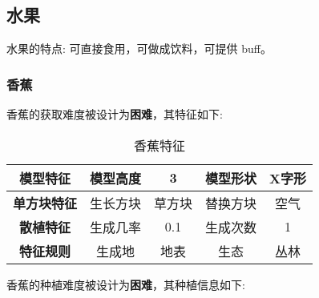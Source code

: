 \subsection{水果}

水果的特点: 可直接食用，可做成饮料，可提供 buff。

\subsubsection{香蕉}

香蕉的获取难度被设计为\textbf{困难}，其特征如下:
\begin{table}[H]
    \centering
    \caption{香蕉特征}
    \label{table:香蕉特征}
    \setlength{\tabcolsep}{4mm}
    \begin{tabular}{c|cc|cc}
        \toprule
        \textbf{模型特征}                  & 模型高度 & 3      & 模型形状 & X字形 \\
        \midrule
        \textbf{单方块特征}                & 生长方块 & 草方块 & 替换方块 & 空气   \\
        \midrule
        \textbf{散植特征}                  & 生成几率 & 0.1    & 生成次数 & 1      \\
        \midrule
        \textbf{特征规则} & 生成地   & 地表   & 生态     & 丛林   \\
        \bottomrule
    \end{tabular}
\end{table}


香蕉的种植难度被设计为\textbf{困难}，其种植信息如下:

